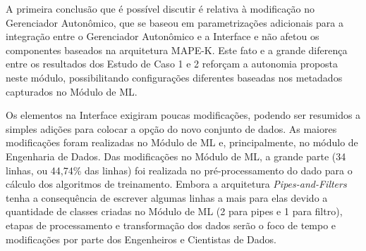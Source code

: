 \documentclass[portugues]{ic-tese}
\begin{document}
\begin{table}[H]
\begin{center}
  \caption{Quantidade de modificações realizadas ao adicionar um novo conjunto de dados ao Módulo de ML}
\label{tbl:ManutencaoPipelineDataset}
\end{center}
\end{table}

A primeira conclusão que é possível discutir é relativa à modificação no Gerenciador Autonômico, que se baseou em parametrizações adicionais para a integração entre o Gerenciador Autonômico e a Interface e não afetou os componentes baseados na arquitetura MAPE-K. Este fato e a grande diferença entre os resultados dos Estudo de Caso 1 e 2 reforçam a autonomia proposta neste módulo, possibilitando configurações diferentes baseadas nos metadados capturados no Módulo de ML.

Os elementos na Interface exigiram poucas modificações, podendo ser resumidos a simples adições para colocar a opção do novo conjunto de dados. As maiores modificações foram realizadas no Módulo de ML e, principalmente, no módulo de Engenharia de Dados. Das modificações no Módulo de ML, a grande parte (34 linhas, ou 44,74\% das linhas) foi realizada no pré-processamento do dado para o cálculo dos algoritmos de treinamento. Embora a arquitetura \textit{Pipes-and-Filters} tenha a consequência de escrever algumas linhas a mais para elas devido a quantidade de classes criadas no Módulo de ML (2 para pipes e 1 para filtro), etapas de processamento e transformação dos dados serão o foco de tempo e modificações por parte dos Engenheiros e Cientistas de Dados.
\end{document}
